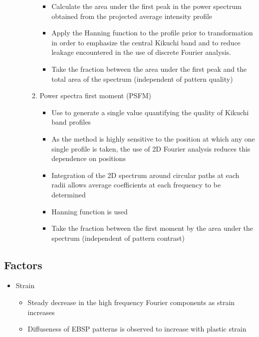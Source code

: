 \documentclass[letterpaper]{article}
\begin{document}
\begin{itemize}
\begin{itemize}
\begin{enumerate}
\begin{itemize}
										\item Calculate the area under the first peak in the power spectrum obtained from the projected average intensity profile
										\item Apply the Hanning function to the profile prior to transformation in order to emphasize the central Kikuchi band and to reduce leakage encountered in the use of discrete Fourier analysis.
										\item Take the fraction between the area under the first peak and the total area of the spectrum (independent of pattern quality)
									\end{itemize}
								\item Power spectra first moment (PSFM)
									\begin{itemize}
											\item Use to generate a single value quantifying the quality of Kikuchi band profiles
											\item As the method is highly sensitive to the position at which any one single profile is taken, the use of 2D Fourier analysis reduces this dependence on positions
											\item Integration of the 2D spectrum around circular paths at each radii allows average coefficients at each frequency to be determined
											\item Hanning function is used
											\item Take the fraction between the first moment by the area under the spectrum (independent of pattern contrast)
										\end{itemize}
							\end{enumerate}
					\end{itemize}
			\end{itemize}
		
		\subsection{Factors}
			\begin{itemize}
				\item Strain
					\begin{itemize}
						\item Steady decrease in the high frequency Fourier components as strain increases
						\item Diffuseness of EBSP patterns is observed to increase with plastic strain
					\end{itemize}
			\end{itemize}
		
\end{document}

